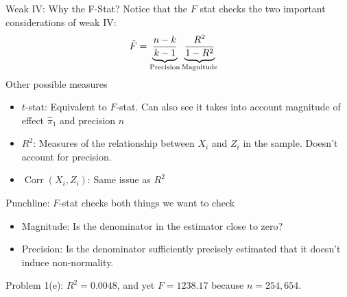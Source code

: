 \documentclass[aspectratio=169, handout]{beamer}
\newcommand{\Corr}{\operatorname{Corr}}
\begin{document}
{\footnotesize
\begin{frame}{Weak IV: Why the F-Stat?}
Notice that the $F$ stat checks the two important considerations of
weak IV:
\begin{align*}
  \tilde{F}
  &=
  \underbrace{\frac{n-k}{k-1}}_{%
    \substack{%
      \text{Precision}
    }
  }
  \underbrace{%
    \frac{R^2}{1-R^2}
  }_{%
    \text{Magnitude}
  }
\end{align*}
Other possible measures
\begin{itemize}
  \item \alert{$t$-stat}: Equivalent to $F$-stat.
    Can also see it takes into account magnitude of effect $\hat{\pi}_1$
    and precision $n$
  \item \alert{$R^2$}: Measures of the relationship between $X_i$ and
    $Z_i$ in the sample.
    Doesn't account for precision.
  \item \alert{$\Corr(X_i,Z_i)$}: Same issue as $R^2$
\end{itemize}
\alert{Punchline}:
$F$-stat checks both things we want to check
\begin{itemize}
  \item \alert{Magnitude}: Is the denominator in the estimator close to
    zero?
  \item \alert{Precision}: Is the denominator sufficiently precisely
    estimated that it doesn't induce non-normality.
\end{itemize}
Problem 1(e):
$R^2=0.0048$, and yet $F=1238.17$ because $n=254,654$.
\end{frame}
}
\end{document}
